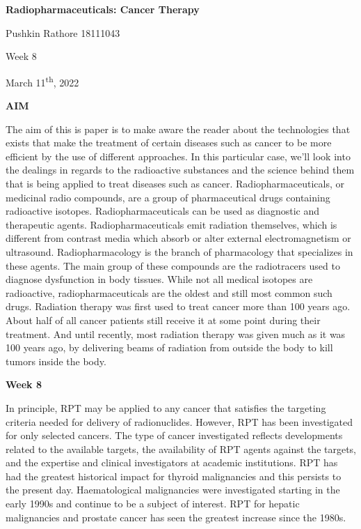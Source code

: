 \documentclass[
]{article}
\author{}
\date{}
\begin{document}
\textbf{{Radiopharmaceuticals: Cancer Therapy}}

Pushkin Rathore 18111043

Week 8

March 11\textsuperscript{th}, 2022

\textbf{AIM}

The aim of this is paper is to make aware the reader about the
technologies that exists that make the treatment of certain diseases
such as cancer to be more efficient by the use of different approaches.
In this particular case, we'll look into the dealings in regards to the
radioactive substances and the science behind them that is being applied
to treat diseases such as cancer. Radiopharmaceuticals, or medicinal
radio compounds, are a group of pharmaceutical drugs containing
radioactive isotopes. Radiopharmaceuticals can be used as diagnostic and
therapeutic agents. Radiopharmaceuticals emit radiation themselves,
which is different from contrast media which absorb or alter external
electromagnetism or ultrasound. Radiopharmacology is the branch of
pharmacology that specializes in these agents. The main group of these
compounds are the radiotracers used to diagnose dysfunction in body
tissues. While not all medical isotopes are radioactive,
radiopharmaceuticals are the oldest and still most common such drugs.
Radiation therapy was first used to treat cancer more than 100 years
ago. About half of all cancer patients still receive it at some point
during their treatment. And until recently, most radiation therapy was
given much as it was 100 years ago, by delivering beams of radiation
from outside the body to kill tumors inside the body.

\textbf{Week 8}

In principle, RPT may be applied to any cancer that satisfies the
targeting criteria needed for delivery of radionuclides. However, RPT
has been investigated for only selected cancers. The type of cancer
investigated reflects developments related to the available targets, the
availability of RPT agents against the targets, and the expertise and
clinical investigators at academic institutions. RPT has had the
greatest historical impact for thyroid malignancies and this persists to
the present day. Haematological malignancies were investigated starting
in the early 1990s and continue to be a subject of interest. RPT for
hepatic malignancies and prostate cancer has seen the greatest increase
since the 1980s.
\end{document}

